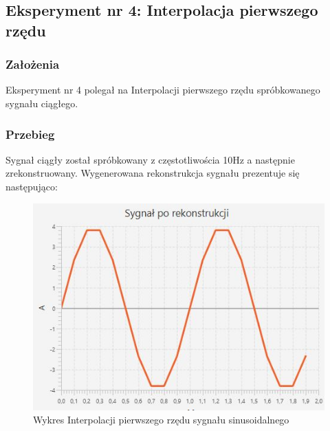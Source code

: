 \documentclass[12pt]{article}
\begin{document}

\newpage
\subsection{Eksperyment nr 4: Interpolacja pierwszego rzędu}

\subsubsection{Założenia}
Eksperyment nr 4 polegał na Interpolacji pierwszego rzędu spróbkowanego sygnału ciągłego.
\subsubsection{Przebieg}
Sygnał ciągły został spróbkowany z częstotliwościa 10Hz a następnie zrekonstruowany.
Wygenerowana rekonstrukcja sygnału prezentuje się następująco:
\begin{figure}[H]
	\centering
	\includegraphics[width=\linewidth]{sygnal_interpolacja_pierwszy.jpg}
	\caption{Wykres Interpolacji pierwszego rzędu sygnału sinusoidalnego}
	\label{wykres dla eksperymentu 4}
\end{figure}
\end{document}
